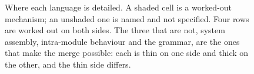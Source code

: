 \begin{figure}[t]
\caption{Where each language is detailed. A shaded cell is a worked-out
mechanism; an unshaded one is named and not specified. Four rows are worked
out on both sides. The three that are not, system assembly, intra-module
behaviour and the grammar, are the ones that make the merge possible: each
is thin on one side and thick on the other, and the thin side differs.}
\label{fig:asymmetry}
\end{figure}
